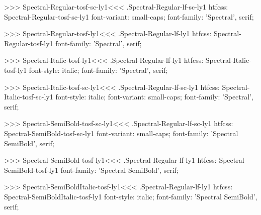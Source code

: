 >>>
\<Spectral-Regular-tosf-sc-ly1\><<<
.Spectral-Regular-lf-sc-ly1
htfcss:  Spectral-Regular-tosf-sc-ly1  font-variant: small-caps; font-family: 'Spectral', serif;

>>>
\<Spectral-Regular-tosf-ly1\><<<
.Spectral-Regular-lf-ly1
htfcss:  Spectral-Regular-tosf-ly1  font-family: 'Spectral', serif;

>>>
\<Spectral-Italic-tosf-ly1\><<<
.Spectral-Regular-lf-ly1
htfcss:  Spectral-Italic-tosf-ly1  font-style: italic; font-family: 'Spectral', serif;

>>>
\<Spectral-Italic-tosf-sc-ly1\><<<
.Spectral-Regular-lf-sc-ly1
htfcss:  Spectral-Italic-tosf-sc-ly1  font-style: italic; font-variant: small-caps; font-family: 'Spectral', serif;

>>>
\<Spectral-SemiBold-tosf-sc-ly1\><<<
.Spectral-Regular-lf-sc-ly1
htfcss:  Spectral-SemiBold-tosf-sc-ly1  font-variant: small-caps; font-family: 'Spectral SemiBold', serif;

>>>
\<Spectral-SemiBold-tosf-ly1\><<<
.Spectral-Regular-lf-ly1
htfcss:  Spectral-SemiBold-tosf-ly1  font-family: 'Spectral SemiBold', serif;

>>>
\<Spectral-SemiBoldItalic-tosf-ly1\><<<
.Spectral-Regular-lf-ly1
htfcss:  Spectral-SemiBoldItalic-tosf-ly1  font-style: italic; font-family: 'Spectral SemiBold', serif;

